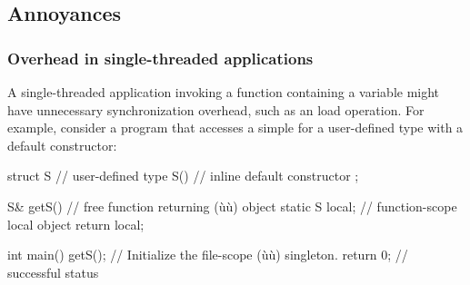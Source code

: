 \subsection[Annoyances]{Annoyances}\label{annoyances}

\subsubsection[Overhead in single-threaded applications]{Overhead in single-threaded applications}\label{overhead-in-single-threaded-applications}

A single-threaded application invoking a function containing a
  variable might
have unnecessary synchronization overhead, such as an 
load operation. For example, consider a program that accesses
a simple   for a user-defined type with a
 default constructor:

\begin{emcppslisting}
struct S  // user-defined type
{
    S() { }  // inline default constructor
};

S& getS()  // free function returning (ù{}ù) object
{
    static S local;  // function-scope local object
    return local;
}

int main()
{
    getS();    // Initialize the file-scope (ù{}ù) singleton.
    return 0;  // successful status
}
\end{emcppslisting}

